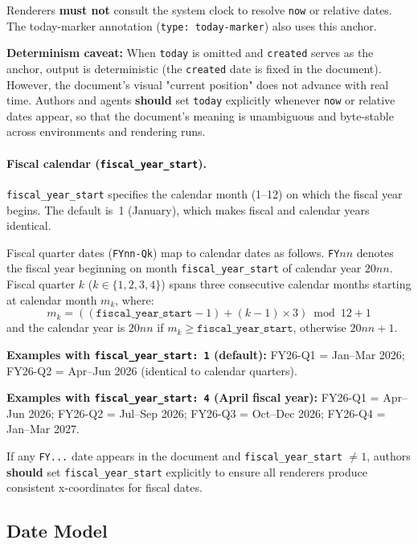 Renderers \textbf{must not} consult the system clock to resolve \texttt{now} or relative
dates. The today-marker annotation (\texttt{type: today-marker}) also uses this anchor.

\textbf{Determinism caveat:} When \texttt{today} is omitted and \texttt{created} serves
as the anchor, output is deterministic (the \texttt{created} date is fixed in the
document). However, the document's visual "current position" does not advance with real
time. Authors and agents \textbf{should} set \texttt{today} explicitly whenever \texttt{now}
or relative dates appear, so that the document's meaning is unambiguous and byte-stable
across environments and rendering runs.

\paragraph{Fiscal calendar (\texttt{fiscal\_year\_start}).}
\texttt{fiscal\_year\_start} specifies the calendar month (1--12) on which the fiscal year
begins. The default is~1 (January), which makes fiscal and calendar years identical.

Fiscal quarter dates (\texttt{FYnn-Qk}) map to calendar dates as follows. \texttt{FY}$nn$
denotes the fiscal year beginning on month \texttt{fiscal\_year\_start} of calendar year
$20nn$. Fiscal quarter $k$ ($k \in \{1,2,3,4\}$) spans three consecutive calendar months
starting at calendar month $m_k$, where:
\[
  m_k = ((\texttt{fiscal\_year\_start} - 1) + (k - 1) \times 3) \bmod 12 + 1
\]
and the calendar year is $20nn$ if $m_k \ge \texttt{fiscal\_year\_start}$, otherwise
$20nn + 1$.

\textbf{Examples with \texttt{fiscal\_year\_start: 1} (default):}
FY26-Q1 = Jan--Mar 2026; FY26-Q2 = Apr--Jun 2026 (identical to calendar quarters).

\textbf{Examples with \texttt{fiscal\_year\_start: 4} (April fiscal year):}
FY26-Q1 = Apr--Jun 2026; FY26-Q2 = Jul--Sep 2026; FY26-Q3 = Oct--Dec 2026;
FY26-Q4 = Jan--Mar 2027.

If any \texttt{FY...} date appears in the document and \texttt{fiscal\_year\_start}
$\neq 1$, authors \textbf{should} set \texttt{fiscal\_year\_start} explicitly to ensure
all renderers produce consistent x-coordinates for fiscal dates.


\subsection{Date Model}
\label{sec:date-model}

